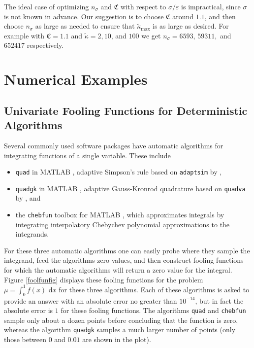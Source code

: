 \documentclass[graybox]{svmult}
\newcommand{\fudge}{\mathfrak{C}}
\newcommand{\rd}{\,\mathrm{d}}
\newcommand{\dif}{\rd}
\newcommand{\tkappa}{\tilde{\kappa}}
\begin{document}
The ideal case of optimizing $n_\sigma$ and $\fudge$ with respect to $\sigma/\varepsilon$ is impractical, since $\sigma$ is not known in advance.  Our suggestion is to choose $\fudge$ around $1.1$, and then choose $n_\sigma$ as large as needed to ensure that $\tkappa_{\max}$ is as large as desired. For example with  $\fudge = 1.1$ and 
$\tilde \kappa = 2, 10$, and $100$
we get $n_\sigma = 6593$, $59311,$ and $652417$ respectively.

\section{Numerical Examples} \label{numerexsec}

\subsection{Univariate Fooling Functions for Deterministic Algorithms}

Several commonly used software packages have automatic algorithms for integrating functions of a single variable.  These include 
\begin{itemize} 

\item {\tt quad} in MATLAB \citep{MAT7.12}, adaptive Simpson's rule based on {\tt adaptsim} by \cite{GanGau00a},

\item {\tt quadgk} in MATLAB \citep{MAT7.12}, adaptive Gauss-Kronrod quadrature based on {\tt quadva} by \cite{Sha08a}, and

\item the {\tt chebfun} \citep{TrefEtal12} toolbox for MATLAB \citep{MAT7.12}, which approximates integrals by integrating interpolatory Chebychev polynomial approximations to the integrands.


\end{itemize}

For these three automatic algorithms one can easily probe where they sample the integrand, feed the algorithms zero values, and then construct fooling functions for which the automatic algorithms will return a zero value for the integral.  Figure \ref{foolfunfig} displays these fooling functions for the problem $\mu=\int_0^1 f(x) \, \dif x$ for these three algorithms. Each of these algorithms is asked to provide an answer with an absolute error no greater than $10^{-14}$, but in fact the absolute error is $1$ for these fooling functions.  The algorithms {\tt quad} and {\tt chebfun} sample only about a dozen points before concluding that the function is zero, whereas the algorithm {\tt quadgk} samples a much larger number of points (only those between $0$ and $0.01$ are shown in the plot). 
\end{document}
